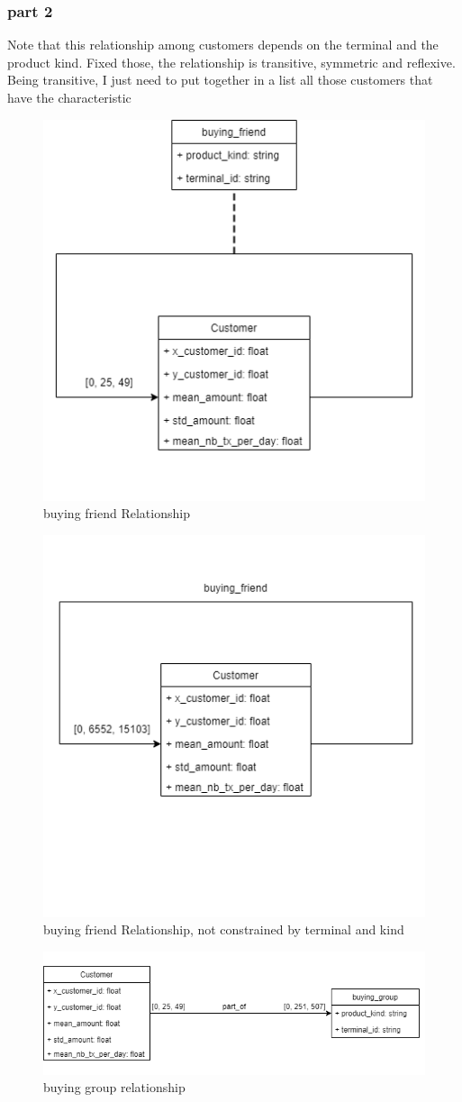 \documentclass[runningheads]{llncs}
\begin{document}
\subsubsection{part 2}
Note that this relationship among customers depends on the terminal and the product kind. Fixed those, the relationship is transitive, symmetric and reflexive.\\
Being transitive, I just need to put together in a list all those customers that have the characteristic\\
\begin{figure}[!htb] 
        \centering \includegraphics[width=0.5\columnwidth]{images/buyingFriends_base.png}
        \caption{\label{fig4}buying friend Relationship}
\end{figure}
\begin{figure}[!htb] 
        \centering \includegraphics[width=0.5\columnwidth]{images/buyingFriends_all.png}
        \caption{\label{fig5}buying friend Relationship, not constrained by terminal and kind}
\end{figure}
\begin{figure}[!htb] 
        \centering \includegraphics[width=0.5\columnwidth]{images/buyingFriends_group.png}
        \caption{\label{fig6}buying group relationship}
\end{figure}
\end{document}
